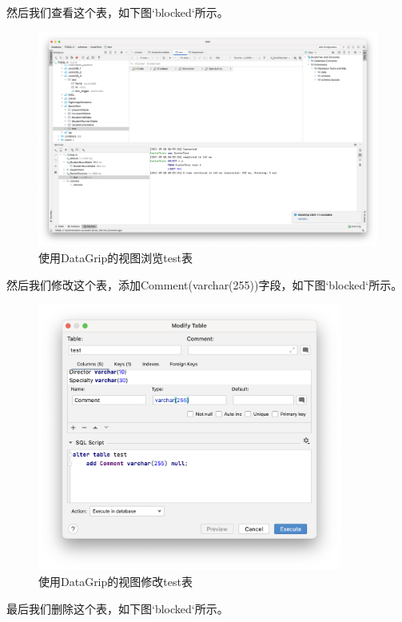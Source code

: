 \documentclass[a4paper,UTF8,heading=false,12pt]{article}
\begin{document}
    然后我们查看这个表，如下图`blocked`所示。

    \begin{figure}[htbp]
        \centering
        \includegraphics[width=15cm]{../Images/TestTable_OnView.png}
        \caption{使用DataGrip的视图浏览test表}
    \end{figure}

    然后我们修改这个表，添加Comment(varchar(255))字段，如下图`blocked`所示。

    \begin{figure}[htbp]
        \centering
        \includegraphics[width=10cm]{../Images/TestTable_OnChange.png}
        \caption{使用DataGrip的视图修改test表}
    \end{figure}

    最后我们删除这个表，如下图`blocked`所示。
\end{document}
